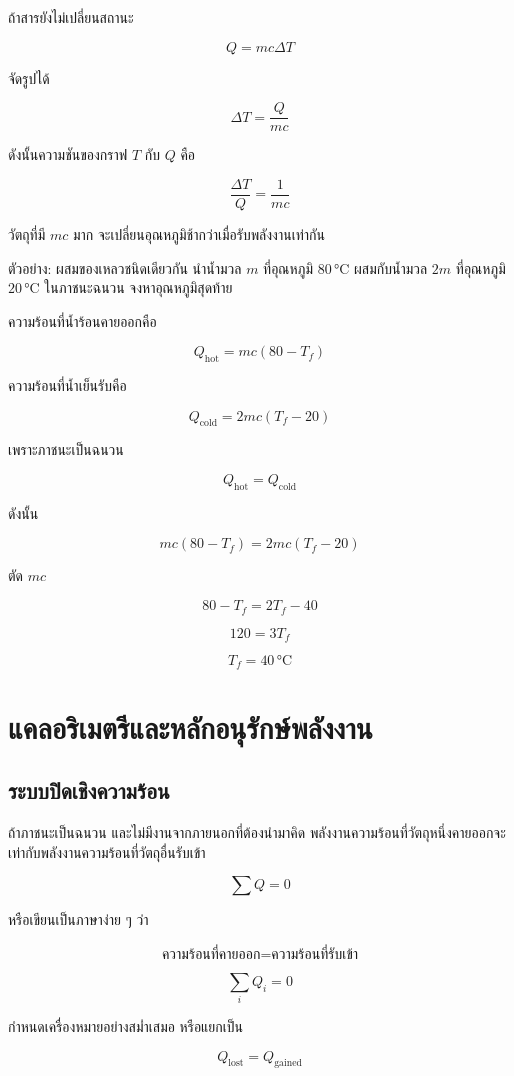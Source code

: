 ถ้าสารยังไม่เปลี่ยนสถานะ

\[
Q=mc\Delta T
\]

จัดรูปได้

\[
\Delta T=\frac{Q}{mc}
\]

ดังนั้นความชันของกราฟ $T$ กับ $Q$ คือ

\[
\frac{\Delta T}{Q}=\frac{1}{mc}
\]

วัตถุที่มี $mc$ มาก จะเปลี่ยนอุณหภูมิช้ากว่าเมื่อรับพลังงานเท่ากัน

\begin{examplebox}{ตัวอย่าง: ผสมของเหลวชนิดเดียวกัน}
นำน้ำมวล $m$ ที่อุณหภูมิ $80\,\si{\degreeCelsius}$ ผสมกับน้ำมวล $2m$ ที่อุณหภูมิ $20\,\si{\degreeCelsius}$ ในภาชนะฉนวน จงหาอุณหภูมิสุดท้าย

ความร้อนที่น้ำร้อนคายออกคือ

\[
Q_{\text{hot}}=mc(80-T_f)
\]

ความร้อนที่น้ำเย็นรับคือ

\[
Q_{\text{cold}}=2mc(T_f-20)
\]

เพราะภาชนะเป็นฉนวน

\[
Q_{\text{hot}}=Q_{\text{cold}}
\]

ดังนั้น

\[
mc(80-T_f)=2mc(T_f-20)
\]

ตัด $mc$

\[
80-T_f=2T_f-40
\]

\[
120=3T_f
\]

\[
\boxed{T_f=40\,\si{\degreeCelsius}}
\]
\end{examplebox}

\section{แคลอริเมตรีและหลักอนุรักษ์พลังงาน}

\subsection{ระบบปิดเชิงความร้อน}

ถ้าภาชนะเป็นฉนวน และไม่มีงานจากภายนอกที่ต้องนำมาคิด พลังงานความร้อนที่วัตถุหนึ่งคายออกจะเท่ากับพลังงานความร้อนที่วัตถุอื่นรับเข้า

\[
\sum Q=0
\]

หรือเขียนเป็นภาษาง่าย ๆ ว่า

\[
\text{ความร้อนที่คายออก}
=
\text{ความร้อนที่รับเข้า}
\]

\begin{tcolorbox}[title=หลักของโจทย์ผสมสาร]
\[
\boxed{\sum_i Q_i=0}
\]

กำหนดเครื่องหมายอย่างสม่ำเสมอ หรือแยกเป็น

\[
\boxed{Q_{\text{lost}}=Q_{\text{gained}}}
\]
\end{tcolorbox}

